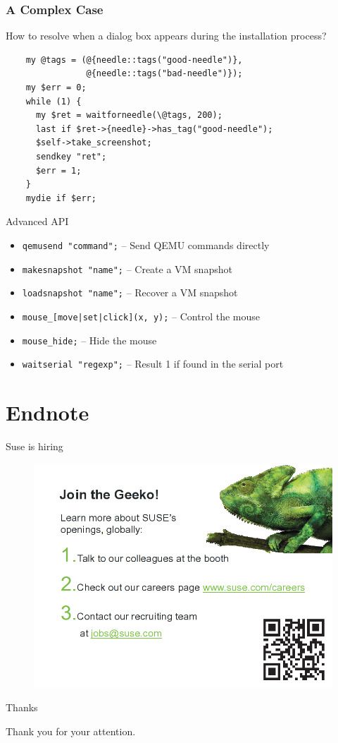 \documentclass{beamer}
\begin{document}
\begin{frame}[fragile]
  \frametitle{A Complex Case}
  How to resolve when a dialog box appears during the installation process?
  \lstset{style=myperl}
  \begin{lstlisting}
    my @tags = (@{needle::tags("good-needle")},
                @{needle::tags("bad-needle")});
    my $err = 0;
    while (1) {
      my $ret = waitforneedle(\@tags, 200);
      last if $ret->{needle}->has_tag("good-needle");
      $self->take_screenshot;
      sendkey "ret";
      $err = 1;
    }
    mydie if $err;
  \end{lstlisting}
\end{frame}


\begin{frame}{Advanced API}
  \begin{itemize}
  \item \texttt{qemusend "command";} -- Send QEMU commands directly
  \item \texttt{makesnapshot "name";} -- Create a VM snapshot
  \item \texttt{loadsnapshot "name";} -- Recover a VM snapshot
  \item \texttt{mouse\_[move|set|click](x, y);} -- Control the mouse
  \item \texttt{mouse\_hide;} -- Hide the mouse
  \item \texttt{waitserial "regexp";} -- Result 1 if found in the serial port
  \end{itemize}
\end{frame}


\section{Endnote}

\begin{frame}{Suse is hiring}
  \begin{figure}
    \includegraphics[width= 0.8\linewidth]{suse_hiring.png}
  \end{figure}
\end{frame}

\begin{frame}{Thanks}
  \begin{center}
    Thank you for your attention.
  \end{center}
\end{frame}
\end{document}
